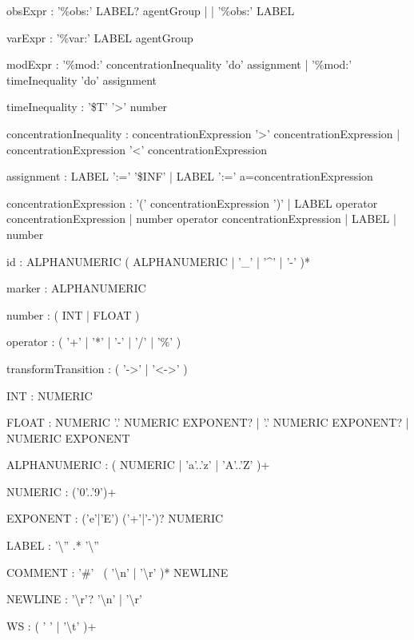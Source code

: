 \begin{bnfsource}



obsExpr :
  '\%obs:' LABEL? agentGroup
  | 
  | '\%obs:' LABEL

varExpr :
  '\%var:' LABEL agentGroup

modExpr :
  '\%mod:' concentrationInequality 'do' assignment
  | '\%mod:' timeInequality 'do' assignment
  
timeInequality :
  '\$T' '>' number
  
concentrationInequality :
  concentrationExpression '>' concentrationExpression
  | concentrationExpression '<' concentrationExpression
  

assignment :
  LABEL ':=' '\$INF'
  | LABEL ':=' a=concentrationExpression

concentrationExpression :
  '(' concentrationExpression ')'
  | LABEL operator concentrationExpression
  | number operator concentrationExpression
  | LABEL
  | number
  
  
  
id :
  ALPHANUMERIC ( ALPHANUMERIC | '_' | '^' | '-' )*

marker :
  ALPHANUMERIC

number :
  ( INT | FLOAT )
  
operator :
  ( '+' | '*' | '-' | '/' | '\%' )

transformTransition :
  ( '->' | '<->' )


INT :
  NUMERIC

FLOAT :
    NUMERIC '.' NUMERIC EXPONENT?
    | '.' NUMERIC EXPONENT?
    | NUMERIC EXPONENT


ALPHANUMERIC :
  ( NUMERIC | 'a'..'z' | 'A'..'Z' )+

NUMERIC :
  ('0'..'9')+
  
EXPONENT :
  ('e'|'E') ('+'|'-')? NUMERIC

LABEL :
  '{\textbackslash}'' .* '{\textbackslash}''

COMMENT :
  '#' ~( '{\textbackslash}n' | '{\textbackslash}r' )* NEWLINE

NEWLINE :
  '{\textbackslash}r'? '{\textbackslash}n' | '{\textbackslash}r'

WS :
  ( ' ' | '{\textbackslash}t' )+
\end{bnfsource}
